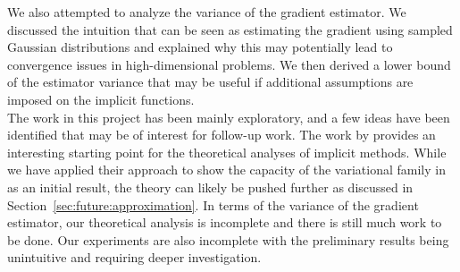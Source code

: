 \documentclass[10pt]{article}
\begin{document}
We also attempted to analyze the variance of the \elbo gradient estimator. We discussed the intuition that \uivi can be seen as estimating the \elbo gradient using sampled Gaussian distributions and explained why this may potentially lead to convergence issues in high-dimensional problems. We then derived a lower bound of the estimator variance that may be useful if additional assumptions are imposed on the implicit functions.
\\

The work in this project has been mainly exploratory, and a few ideas have been identified that may be of interest for follow-up work. The work by \citet{Plummer:2021} provides an interesting starting point for the theoretical analyses of implicit \vi methods. While we have applied their approach to show the capacity of the variational family in \uivi as an initial result, the theory can likely be pushed further as discussed in Section~\ref{sec:future:approximation}. In terms of the variance of the \elbo gradient estimator, our theoretical analysis is incomplete and there is still much work to be done. Our experiments are also incomplete with the preliminary results being unintuitive and requiring deeper investigation.


\newpage




\end{document}
